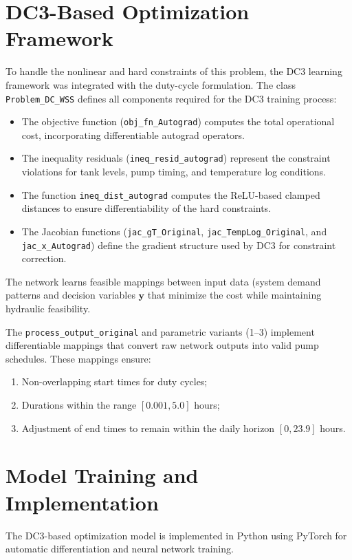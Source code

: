 \section{DC3-Based Optimization Framework}

To handle the nonlinear and hard constraints of this problem, the DC3 learning framework was integrated with the duty-cycle formulation. The class \texttt{Problem\_DC\_WSS} defines all components required for the DC3 training process:
\begin{itemize}
    \item The objective function (\texttt{obj\_fn\_Autograd}) computes the total operational cost, incorporating differentiable autograd operators.
    \item The inequality residuals (\texttt{ineq\_resid\_autograd}) represent the constraint violations for tank levels, pump timing, and temperature log conditions.
    \item The function \texttt{ineq\_dist\_autograd} computes the ReLU-based clamped distances to ensure differentiability of the hard constraints.
    \item The Jacobian functions (\texttt{jac\_gT\_Original}, \texttt{jac\_TempLog\_Original}, and \texttt{jac\_x\_Autograd}) define the gradient structure used by DC3 for constraint correction.
\end{itemize}

The network learns feasible mappings between input data (system demand patterns and decision variables $\mathbf{y}$ that minimize the cost while maintaining hydraulic feasibility.

The \texttt{process\_output\_original} and parametric variants (1–3) implement differentiable mappings that convert raw network outputs into valid pump schedules. These mappings ensure:
\begin{enumerate}
    \item Non-overlapping start times for duty cycles;
    \item Durations within the range $[0.001, 5.0]$ hours;
    \item Adjustment of end times to remain within the daily horizon $[0, 23.9]$ hours.
\end{enumerate}

\section{Model Training and Implementation}

The DC3-based optimization model is implemented in Python using PyTorch for automatic differentiation and neural network training.

